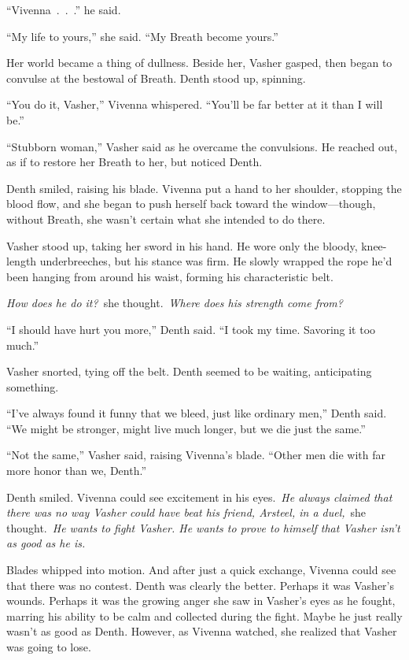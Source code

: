 “Vivenna~.~.~.” he said.

“My life to yours,” she said. “My Breath become yours.”

Her world became a thing of dullness. Beside her, Vasher gasped, then began to convulse at the bestowal of Breath. Denth stood up, spinning.

“You do it, Vasher,” Vivenna whispered. “You’ll be far better at it than I will be.”

“Stubborn woman,” Vasher said as he overcame the convulsions. He reached out, as if to restore her Breath to her, but noticed Denth.

Denth smiled, raising his blade. Vivenna put a hand to her shoulder, stopping the blood flow, and she began to push herself back toward the window—though, without Breath, she wasn’t certain what she intended to do there.

Vasher stood up, taking her sword in his hand. He wore only the bloody, knee-length underbreeches, but his stance was firm. He slowly wrapped the rope he’d been hanging from around his waist, forming his characteristic belt.

\textit{How does he do it?}~she thought.~\textit{Where does his strength come from?}

“I should have hurt you more,” Denth said. “I took my time. Savoring it too much.”

Vasher snorted, tying off the belt. Denth seemed to be waiting, anticipating something.

“I’ve always found it funny that we bleed, just like ordinary men,” Denth said. “We might be stronger, might live much longer, but we die just the same.”

“Not the same,” Vasher said, raising Vivenna’s blade. “Other men die with far more honor than we, Denth.”

Denth smiled. Vivenna could see excitement in his eyes.~\textit{He always claimed that there was no way Vasher could have beat his friend, Arsteel, in a duel,}~she thought.~\textit{He wants to fight Vasher. He wants to prove to himself that Vasher isn’t as good as he is.}

Blades whipped into motion. And after just a quick exchange, Vivenna could see that there was no contest. Denth was clearly the better. Perhaps it was Vasher’s wounds. Perhaps it was the growing anger she saw in Vasher’s eyes as he fought, marring his ability to be calm and collected during the fight. Maybe he just really wasn’t as good as Denth. However, as Vivenna watched, she realized that Vasher was going to lose.

